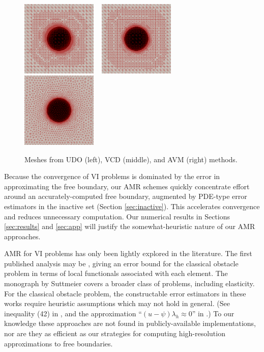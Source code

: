 \documentclass[]{interact}
\theoremstyle{plain}%
\theoremstyle{definition}
\theoremstyle{remark}
\begin{document}
\begin{figure}[ht]
\noindent \hspace{-1mm} \mbox{\includegraphics[width=0.32\textwidth]{static/sphereudo.png} \, \includegraphics[width=0.32\textwidth]{static/spherevcd.png} \,\,\includegraphics[width=0.32\textwidth]{static/sphereavm.png}}
\caption{Meshes from UDO (left), VCD (middle), and AVM (right) methods.}
\label{fig:threeballmeshes}
\end{figure}

Because the convergence of VI problems is dominated by the error in approximating the free boundary, our AMR schemes quickly concentrate effort around an accurately-computed free boundary, augmented by PDE-type error estimators in the inactive set (Section \ref{sec:inactive}).  This accelerates convergence and reduces unnecessary computation.  Our numerical results in Sections \ref{sec:results} and \ref{sec:app} will justify the somewhat-heuristic nature of our AMR approaches.  

AMR for VI problems has only been lightly explored in the literature.  The first published analysis may be \cite{AinsworthOdenLee1993}, giving an error bound for the classical obstacle problem in terms of local functionals associated with each element.  The monograph by Suttmeier \cite{Suttmeier2008} covers a broader class of problems, including elasticity.  For the classical obstacle problem, the constructable error estimators in these works require heuristic assumptions which may not hold in general.  (See inequality (42) in \cite{AinsworthOdenLee1993}, and the approximation ``$(u-\psi)\lambda_h\approx 0$'' in \cite{Suttmeier2008}.)  To our knowledge these approaches are not found in publicly-available implementations, nor are they as efficient as our strategies for computing high-resolution approximations to free boundaries.
\end{document}
